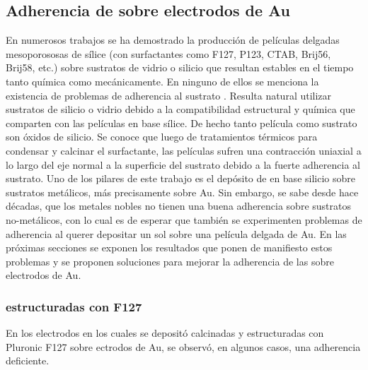	\subsection{Adherencia de \pdm\space sobre electrodos de Au}	

		 En numerosos trabajos se ha demostrado la producción de películas delgadas mesoporososas de sílice (con surfactantes como F127, P123, CTAB, Brij56, Brij58, etc.) sobre sustratos de vidrio o silicio que resultan estables en el tiempo tanto química como mecánicamente. En ninguno de ellos se menciona la existencia de problemas de adherencia al sustrato \cite{Angelome2008,Fuertes2010,Violi2015}. Resulta natural utilizar sustratos de silicio o vidrio debido a la compatibilidad estructural y química que comparten con las películas en base sílice. De hecho tanto película como sustrato son óxidos de silicio. Se conoce que luego de tratamientos térmicos para condensar y calcinar el surfactante, las películas sufren una contracción uniaxial a lo largo del eje normal a la superficie del sustrato debido a la fuerte adherencia al sustrato.\cite{Grosso2004,Soler-Illia2012,Chougnet2005} Uno de los pilares de este trabajo es el depósito de \pdm\space en base silicio sobre sustratos metálicos, más precisamente sobre Au. Sin embargo, se sabe desde hace décadas, que los metales nobles no tienen una buena adherencia sobre sustratos no-metálicos\cite{Kern1990,Hieber1976}, con lo cual es de esperar que también se experimenten problemas de adherencia al querer depositar un sol sobre una película delgada de Au. \cite{Meyer2004,Nugen2009,nasa1973} En las próximas secciones se exponen los resultados que ponen de manifiesto estos problemas y se proponen soluciones para mejorar la adherencia de las \pdm\space sobre electrodos de Au.

		\subsubsection{\pdm\space estructuradas con F127}

			 En los electrodos en los cuales se depositó \pdm\space calcinadas y estructuradas con Pluronic F127 sobre ectrodos de Au, se observó, en algunos casos, una adherencia deficiente. 
				

